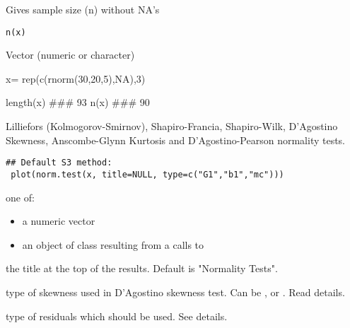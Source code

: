 \documentclass[a4paper]{book}
\begin{document}
\newpage
{}
%
\begin{Description}\relax
Gives sample size (n) without NA's
\end{Description}
%
\begin{Usage}
\begin{verbatim}
n(x)
\end{verbatim}
\end{Usage}
%
\begin{Arguments}
\begin{ldescription}
\item[\code{x}] 
Vector (numeric or character)

\end{ldescription}
\end{Arguments}
%
\begin{Examples}
\begin{ExampleCode}
x= rep(c(rnorm(30,20,5),NA),3)

length(x)   ### 93
n(x)        ### 90
\end{ExampleCode}
\end{Examples}
\newpage
{}
%
\begin{Description}\relax
Lilliefors (Kolmogorov-Smirnov), Shapiro-Francia, Shapiro-Wilk, 
D'Agostino Skewness, Anscombe-Glynn Kurtosis and D'Agostino-Pearson normality tests.
\end{Description}
%
\begin{Usage}
\begin{verbatim}
## Default S3 method:
 plot(norm.test(x, title=NULL, type=c("G1","b1","mc")))
\end{verbatim}
\end{Usage}
%
\begin{Arguments}
\begin{ldescription}
\item[\code{x}] one of:
\begin{itemize}

\item a numeric vector
\item an object of class  resulting from a
calls to 

\end{itemize}


\item[\code{title }] the title at the top of the results. Default is "Normality Tests".
\item[\code{sk }] type of skewness used in D'Agostino skewness test. Can be , or . Read details.
\item[\code{type }] type of residuals which should be used. See details.
\end{ldescription}
\end{Arguments}
\end{document}
